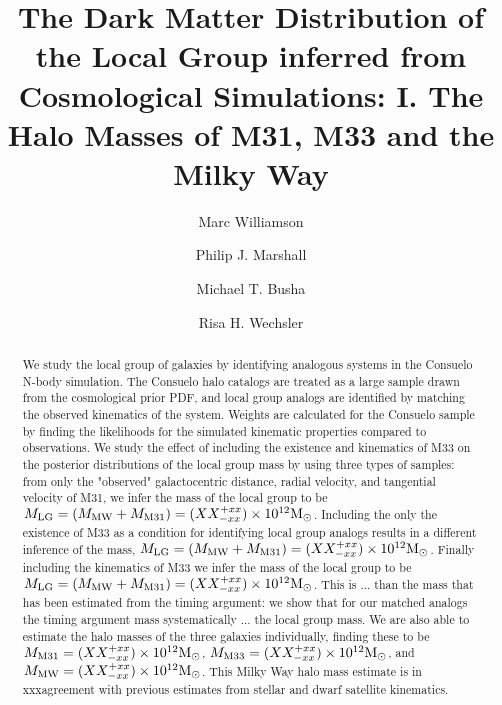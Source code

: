 \documentclass[iop,apj]{emulateapj}
\newcommand{\MMW}{{\rm M}_{\rm MW}}
\newcommand{\Msun}{{\rm M}_\odot}
\newcommand{\consuelo}{{\sc Consuelo }}
\def\MLG{M_{\rm LG}}
\def\MMW{M_{\rm MW}}
\def\MEI{M_{\rm M31}}
\def\MEE{M_{\rm M33}}
\def\MPAIRestimate{XX}
\def\MPAIRerrorplus{xx}
\def\MPAIRerrorminus{xx}
\def\MEIestimate{XX}
\def\MEIerrorplus{xx}
\def\MEIerrorminus{xx}
\def\MEEestimate{XX}
\def\MEEerrorplus{xx}
\def\MEEerrorminus{xx}
\def\MMWestimate{XX}
\def\MMWerrorplus{xx}
\def\MMWerrorminus{xx}
\begin{document}
\title{The Dark Matter Distribution of the Local Group inferred from
Cosmological Simulations: I. The Halo Masses of M31, M33 and the Milky Way}


\author{Marc Williamson}
\author{Philip J. Marshall}
\author{Michael T. Busha} 
\author{Risa H. Wechsler}




\begin{abstract} 

We study the local group of galaxies by identifying analogous systems in the \consuelo N-body simulation.  The \consuelo halo catalogs are treated as a large sample drawn from the cosmological prior PDF, and local group analogs are identified by matching the observed kinematics of the system.  Weights are calculated for the \consuelo sample by finding the likelihoods for the simulated kinematic properties compared to observations.  We study the effect of including the existence and kinematics of M33 on the posterior distributions of the local group mass by using three types of samples: from only the "observed" galactocentric distance, radial velocity, and tangential velocity of M31, we infer the mass of the local group to be $\MLG =
(\MMW + \MEI) = (\MPAIRestimate^{+\MPAIRerrorplus}_{-\MPAIRerrorminus}) \times
10^{12} \Msun$. Including the only the existence of M33 as a condition for identifying local group analogs results in a different inference of the mass, $\MLG =
(\MMW + \MEI) = (\MPAIRestimate^{+\MPAIRerrorplus}_{-\MPAIRerrorminus}) \times
10^{12} \Msun$. Finally including the kinematics of M33 we infer the mass of the local group to be $\MLG =
(\MMW + \MEI) = (\MPAIRestimate^{+\MPAIRerrorplus}_{-\MPAIRerrorminus}) \times
10^{12} \Msun$.  This is ... than the mass that has been estimated from the
timing argument: we show that for our matched analogs the timing argument mass
systematically ... the local group mass.  We are also able to estimate the halo masses of the three galaxies
individually, finding these to be $\MEI =
(\MEIestimate^{+\MEIerrorplus}_{-\MEIerrorminus}) \times 10^{12} \Msun$, $\MEE
= (\MEEestimate^{+\MEEerrorplus}_{-\MEEerrorminus}) \times 10^{12} \Msun$, 
and $\MMW = (\MMWestimate^{+\MMWerrorplus}_{-\MMWerrorminus}) \times 10^{12}
\Msun$. 
%
This Milky Way halo mass estimate is in xxxagreement with previous estimates
from stellar and dwarf satellite kinematics.


\end{abstract}
\end{document}
